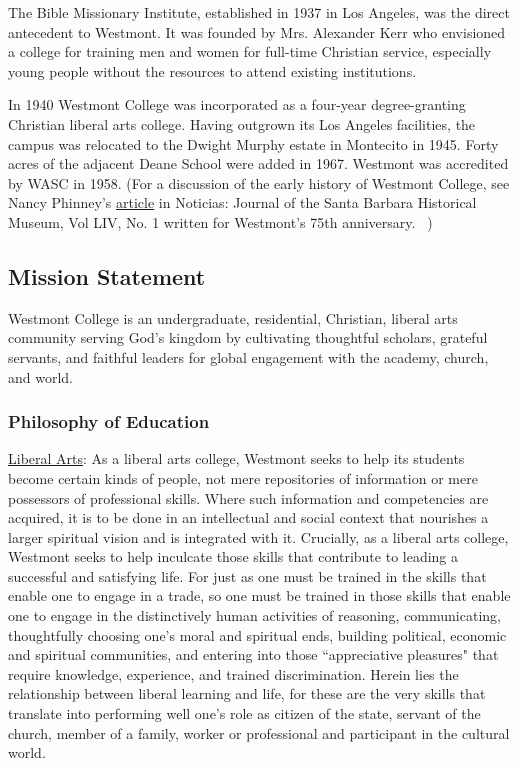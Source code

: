 \documentclass[letterpaper, 11pt]{article}
\begin{document}
		The Bible Missionary Institute, established in 1937 in Los Angeles, was the
		direct antecedent to Westmont. It was founded by Mrs. Alexander Kerr who
		envisioned a college for training men and women for full-time Christian service,
		especially young people without the resources to attend existing institutions.

		In 1940 Westmont College was incorporated as a four-year degree-granting
		Christian liberal arts college. Having outgrown its Los Angeles facilities, the
		campus was relocated to the Dwight Murphy estate in Montecito in 1945.  Forty
		acres of the adjacent Deane School were added in 1967. Westmont was accredited
		by WASC in 1958. (For a discussion of the early history of Westmont College, see
		Nancy Phinney's
		\href{http://www.santabarbaramuseum.com/noticias-article.pdf}{article} in
		Noticias: Journal of the Santa Barbara Historical Museum, Vol LIV, No. 1 written
		for Westmont's 75th anniversary.~\cite{Winner1980}
		)

	\subsection{Mission Statement}

		Westmont College is an undergraduate, residential, Christian, liberal arts
		community serving God's kingdom by cultivating thoughtful scholars, grateful
		servants, and faithful leaders for global engagement with the academy, church,
		and world.

		\subsubsection{Philosophy of Education}

			\underline {Liberal Arts}: As a liberal arts college, Westmont seeks to help its
			students become certain kinds of people, not mere repositories of information or
			mere possessors of professional skills.  Where such information and competencies
			are acquired, it is to be done in an intellectual and social context that
			nourishes a larger spiritual vision and is integrated with it.  Crucially, as a
			liberal arts college, Westmont seeks to help inculcate those skills that
			contribute to leading a successful and satisfying life.  For just as one must be
			trained in the skills that enable one to engage in a trade, so one must be
			trained in those skills that enable one to engage in the distinctively human
			activities of reasoning, communicating, thoughtfully choosing one's moral and
			spiritual ends, building political, economic and spiritual communities, and
			entering into those ``appreciative pleasures" that require knowledge,
			experience, and trained discrimination. Herein lies the relationship between
			liberal learning and life, for these are the very skills that translate into
			performing well one's role as citizen of the state, servant of the church,
			member of a family, worker or professional and participant in the cultural
			world.
\end{document}

